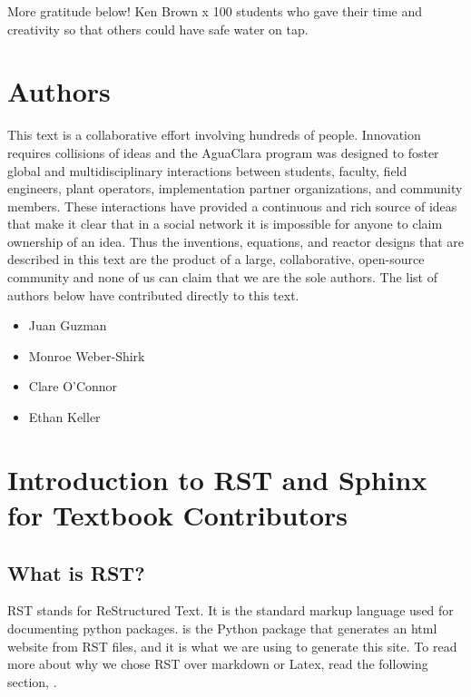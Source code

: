 \documentclass[letterpaper,10pt,english]{sphinxmanual}
\begin{document}
More gratitude below!
Ken Brown
x 100 students who gave their time and creativity so that others could have safe water on tap.


\chapter{Authors}
\label{\detokenize{Authors:authors}}\label{\detokenize{Authors:title-authors}}\label{\detokenize{Authors::doc}}
This text is a collaborative effort involving hundreds of people. Innovation requires collisions of ideas and the AguaClara program was designed to foster global and multidisciplinary interactions between students, faculty, field engineers, plant operators, implementation partner organizations, and community members. These interactions have provided a continuous and rich source of ideas that make it clear that in a social network it is impossible for anyone to claim ownership of an idea. Thus the inventions, equations, and reactor designs that are described in this text are the product of a large, collaborative, open-source community and none of us can claim that we are the sole authors. The list of authors below have contributed directly to this text.
\begin{itemize}
\item {} 
Juan Guzman

\item {} 
Monroe Weber-Shirk

\item {} 
Clare O’Connor

\item {} 
Ethan Keller

\end{itemize}


\chapter{Introduction to RST and Sphinx for Textbook Contributors}
\label{\detokenize{Textbook_Creation_Help/rst_intro:introduction-to-rst-and-sphinx-for-textbook-contributors}}\label{\detokenize{Textbook_Creation_Help/rst_intro:title-rst-intro}}\label{\detokenize{Textbook_Creation_Help/rst_intro::doc}}

\section{What is RST?}
\label{\detokenize{Textbook_Creation_Help/rst_intro:what-is-rst}}\label{\detokenize{Textbook_Creation_Help/rst_intro:heading-what-is-rst}}
RST stands for ReStructured Text. It is the standard markup language used for documenting python packages.  is the Python package that generates an html website from RST files, and it is what we are using to generate this site. To read more about why we chose RST over markdown or Latex, read the following section, {\hyperref[\detokenize{Textbook_Creation_Help/rst_intro:heading-why-rst}]{}}.
\end{document}
